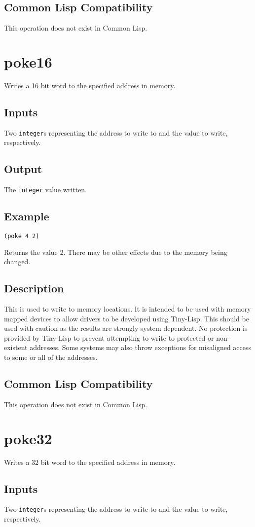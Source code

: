 \documentclass[10pt, openany]{book}
\newcommand{\datatype}[1]{\texttt{#1}}
\newcommand{\tl}{Tiny-Lisp}
\newcommand{\cl}{Common Lisp}
\begin{document}
\subsection{Common Lisp Compatibility}
This operation does not exist in \cl.

\section{poke16}
Writes a 16 bit word to the specified address in memory.
\subsection{Inputs}
Two \datatype{integer}s representing the address to write to and the value to write, respectively.
\subsection{Output}
The \datatype{integer} value written.
\subsection{Example}
\begin{lstlisting}
(poke 4 2)
\end{lstlisting}
Returns the value 2.  There may be other effects due to the memory being changed.
\subsection{Description}
This is used to write to memory locations.  It is intended to be used with memory mapped devices to allow drivers to be developed using \tl{}.  This should be used with caution as the results are strongly system dependent.  No protection is provided by \tl{} to prevent attempting to write to protected or non-existent addresses.  Some systems may also throw exceptions for misaligned access to some or all of the addresses.
\subsection{Common Lisp Compatibility}
This operation does not exist in \cl.

\section{poke32}
Writes a 32 bit word to the specified address in memory.
\subsection{Inputs}
Two \datatype{integer}s representing the address to write to and the value to write, respectively.
\end{document}
